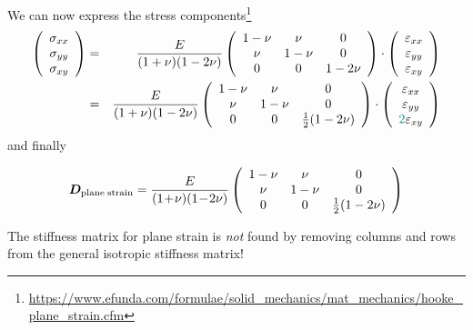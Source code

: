 We can now express the stress 
components\footnote{\url{https://www.efunda.com/formulae/solid_mechanics/mat_mechanics/hooke_plane_strain.cfm}}
\begin{eqnarray}
\left(
\begin{array}{c}
\sigma_{xx}\\
\sigma_{yy}\\
\sigma_{xy}
\end{array}
\right)
&=&\frac{E}{(1+\nu)(1-2\nu)}
\left(
\begin{array}{ccc}
1-\nu & \nu & 0  \\
\nu & 1-\nu & 0 \\
0 & 0 & 1-2\nu
\end{array}
\right)
\cdot
\left(
\begin{array}{c}
\varepsilon_{xx}\\
\varepsilon_{yy}\\
\varepsilon_{xy}
\end{array}
\right) \nonumber\\
&=&\frac{E}{(1+\nu)(1-2\nu)}
\left(
\begin{array}{ccc}
1-\nu & \nu & 0  \\
\nu & 1-\nu & 0 \\
0 & 0 & \frac12(1-2\nu)
\end{array}
\right)
\cdot
\left(
\begin{array}{c}
\varepsilon_{xx}\\
\varepsilon_{yy}\\
{\color{teal}2}\varepsilon_{xy}
\end{array}
\right) 
\end{eqnarray}
and finally
\begin{mdframed}[backgroundcolor=blue!5]
\begin{equation}
{\bm D}_{\rm plane \; strain} = \frac{E}{(1\!+\!\nu)(1\!-\!2\nu)}
\left(
\begin{array}{ccc}
1-\nu & \nu & 0  \\
\nu & 1-\nu & 0 \\
0 & 0 & \frac12(1-2\nu)
\end{array}
\right)
\label{eq:D_pstrain}
\end{equation}
\end{mdframed}

\begin{remark}
The stiffness matrix for plane strain is {\it not} found by removing columns 
and rows from the general isotropic stiffness matrix!
\end{remark}

